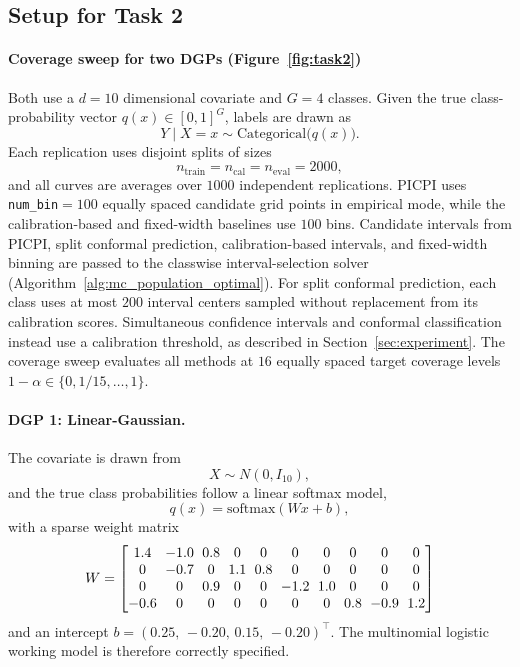 \documentclass[11pt]{article}
\theoremstyle{statplain}
\theoremstyle{statdefinition}
\newcommand{\0}{\mathbf{0}}
\newcommand{\numClass}{G} %
\newcommand{\titleShort}{PICPI\xspace}
\begin{document}
\subsection{Setup for Task 2}\label{app:task2_setup}


\paragraph{Coverage sweep for two DGPs (Figure~\ref{fig:task2})}
 Both use a $d = 10$ dimensional covariate and $\numClass = 4$ classes. Given the true class-probability vector $q(x) \in [0,1]^{\numClass}$, labels are drawn as
\[
Y \mid X = x \sim \mathrm{Categorical}\big(q(x)\big).
\]
Each replication uses disjoint splits of sizes
\[
n_{\mathrm{train}} = n_{\mathrm{cal}} = n_{\mathrm{eval}} = 2000,
\]
and all curves are averages over $1000$ independent replications. \titleShort uses \texttt{num\_bin}$=100$ equally spaced candidate grid points in empirical mode, while the calibration-based and fixed-width baselines use $100$ bins. Candidate intervals from \titleShort, split conformal prediction, calibration-based intervals, and fixed-width binning are passed to the classwise interval-selection solver (Algorithm~\ref{alg:mc_population_optimal}). For split conformal prediction, each class uses at most $200$ interval centers sampled without replacement from its calibration scores. Simultaneous confidence intervals and conformal classification instead use a calibration threshold, as described in Section~\ref{sec:experiment}. The coverage sweep evaluates all methods at $16$ equally spaced target coverage levels $1 - \alpha \in \{0, 1/15, \ldots, 1\}$.

\paragraph{DGP 1: Linear-Gaussian.}
The covariate is drawn from
\[
X \sim N(0, I_{10}),
\]
and the true class probabilities follow a linear softmax model,
\[
q(x) = \mathrm{softmax}(W x + b),
\]
with a sparse weight matrix
{\small
\[
\setlength{\arraycolsep}{3pt}
W =
\begin{bmatrix}
1.4 & -1.0 & 0.8 & 0 & 0 & 0 & 0 & 0 & 0 & 0 \\
0 & -0.7 & 0 & 1.1 & 0.8 & 0 & 0 & 0 & 0 & 0 \\
0 & 0 & 0.9 & 0 & 0 & -1.2 & 1.0 & 0 & 0 & 0 \\
-0.6 & 0 & 0 & 0 & 0 & 0 & 0 & 0.8 & -0.9 & 1.2
\end{bmatrix}
\]
}%
and an intercept $b = (0.25,\,-0.20,\,0.15,\,-0.20)^\top$.
The multinomial logistic working model is therefore correctly specified.
\end{document}

